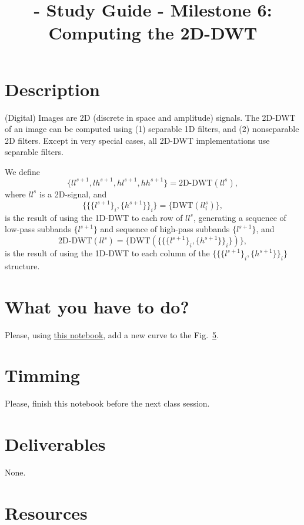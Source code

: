 
\title{\SM{} - Study Guide - Milestone 6: Computing the 2D-DWT}

\maketitle

\section{Description}

(Digital) Images are 2D (discrete in space and amplitude) signals. The
2D-DWT of an image can be computed using (1) separable 1D filters, and
(2) nonseparable 2D filters. Except in very special cases, all 2D-DWT
implementations use separable filters.

We define
\begin{equation}
  \{ll^{s+1}, lh^{s+1}, hl^{s+1}, hh^{s+1}\} = \text{2D-DWT}(ll^s),
  \label{eq:2D-DWT}
\end{equation}
where $ll^s$ is a 2D-signal, and
\begin{equation}
  \{\{\{l^{s+1}\}_i, \{h^{s+1}\}\}_i\} = \{\text{DWT}(ll^s_i)\},
  \label{eq:DWT}
\end{equation}
is the result of using the 1D-DWT to each row of $ll^s$, generating
a sequence of low-pass subbands $\{l^{s+1}\}$ and sequence of
high-pass subbands $\{l^{s+1}\}$, and
\begin{equation}
   \text{2D-DWT}(ll^s) = \{\text{DWT}(\{\{\{l^{s+1}\}_i, \{h^{s+1}\}\}_i\})\},
  \label{eq:DWT}
\end{equation}
is the result of using the 1D-DWT to each column of the
$\{\{\{l^{s+1}\}_i, \{h^{s+1}\}\}_i\}$ structure.

\section{What you have to do?}
  
Please, using \href{}{this notebook}, add a new curve to the Fig.~\ref{}.

\section{Timming}

Please, finish this notebook before the next class session.

\section{Deliverables}

None.

\section{Resources}


